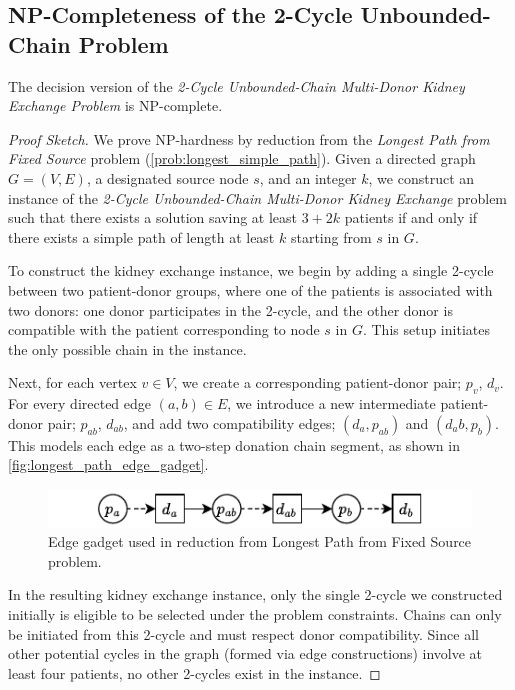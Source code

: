 \subsection{NP-Completeness of the 2-Cycle Unbounded-Chain Problem}

\begin{lemma}
The decision version of the \textit{2-Cycle Unbounded-Chain Multi-Donor Kidney Exchange Problem} is NP-complete.
\end{lemma}

\begin{proof}[Proof Sketch]
We prove NP-hardness by reduction from the \textit{Longest Path from Fixed Source} problem (\autoref{prob:longest_simple_path}). Given a directed graph $G = (V, E)$, a designated source node $s$, and an integer $k$, we construct an instance of the \textit{2-Cycle Unbounded-Chain Multi-Donor Kidney Exchange} problem such that there exists a solution saving at least $3 + 2k$ patients if and only if there exists a simple path of length at least $k$ starting from $s$ in $G$.

To construct the kidney exchange instance, we begin by adding a single 2-cycle between two patient-donor groups, where one of the patients is associated with two donors: one donor participates in the 2-cycle, and the other donor is compatible with the patient corresponding to node $s$ in $G$. This setup initiates the only possible chain in the instance.

Next, for each vertex $v \in V$, we create a corresponding patient-donor pair; $p_v$, $d_v$. For every directed edge $(a, b) \in E$, we introduce a new intermediate patient-donor pair; $p_{ab}$, $d_{ab}$, and add two compatibility edges; $(d_a, p_{ab})$ and $(d_ab, p_b)$. This models each edge as a two-step donation chain segment, as shown in \autoref{fig:longest_path_edge_gadget}.


\begin{figure}
    \centering
    \includegraphics{data/longest_path_edge_gadget.pdf}
    \caption[Edge gadget used in reduction from Longest Path from Fixed Source problem]{Edge gadget used in reduction from Longest Path from Fixed Source problem.}
    \label{fig:longest_path_edge_gadget}
\end{figure}


In the resulting kidney exchange instance, only the single 2-cycle we constructed initially is eligible to be selected under the problem constraints. Chains can only be initiated from this 2-cycle and must respect donor compatibility. Since all other potential cycles in the graph (formed via edge constructions) involve at least four patients, no other 2-cycles exist in the instance.


\end{proof}
